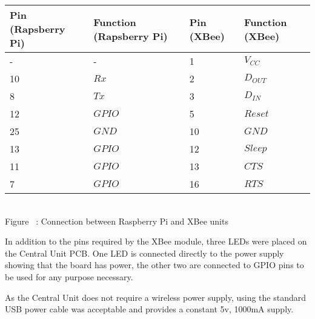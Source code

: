 \begin{center}
  \begin{tabular}{| l | l | l | l |}
    \hline
    \bf{Pin (Rapsberry Pi)} & \bf{Function (Rapsberry Pi)} & \bf{Pin (XBee)} & \bf{Function (XBee)} \\ \hline
     - & - & 1 & \(V_{CC}\) \\ \hline
	10 & \(Rx\) & 2 & \(D_{OUT}\) \\ \hline
	8 & \(Tx\) & 3 & \(D_{IN}\) \\ \hline
	12 & \(GPIO\) & 5 & \(Reset\) \\ \hline
	25 & \(GND\) & 10 & \(GND\) \\ \hline
	13 & \(GPIO\) & 12 & \(Sleep\) \\ \hline
	11 & \(GPIO\) & 13 & \(CTS\) \\ \hline
	7 & \(GPIO\) & 16 & \(RTS\) \\
    \hline
  \end{tabular}
\label{interfacePiXBee}\\
Figure ~: Connection between Raspberry Pi and XBee units
\end{center}


In addition to the pins required by the XBee module, three LEDs were placed on the Central Unit PCB. One LED is connected directly to the power supply showing that the board has power, the other two are connected to GPIO pins to be used for any purpose necessary.

As the Central Unit does not require a wireless power supply, using the standard USB power cable was acceptable and provides a constant 5v, 1000mA supply.
